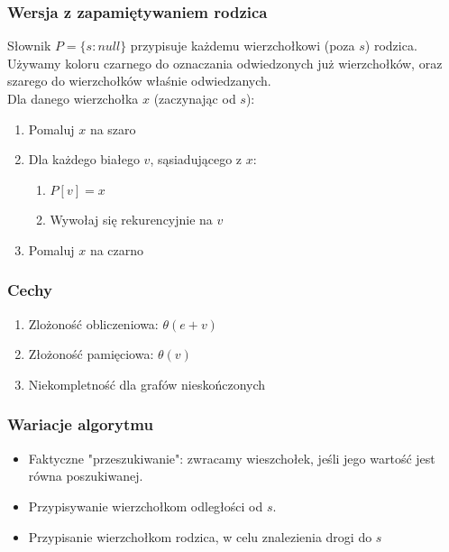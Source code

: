 \documentclass[12pt]{article}
\begin{document}
    \subsubsection{Wersja z zapamiętywaniem rodzica}

    Słownik $P = \{s : null\}$ przypisuje każdemu wierzchołkowi (poza $s$) rodzica. Używamy
    koloru czarnego do oznaczania odwiedzonych już wierzchołków, oraz szarego do
    wierzchołków właśnie odwiedzanych.\[\]
    Dla danego wierzchołka $x$ (zaczynając od $s$):
    \begin{enumerate}
        \item Pomaluj $x$ na szaro
        \item Dla każdego białego $v$, sąsiadującego z $x$:
        \begin{enumerate}
            \item $P[v] = x$
            \item Wywołaj się rekurencyjnie na $v$
        \end{enumerate}
        \item Pomaluj $x$ na czarno
    \end{enumerate}

    \subsubsection{Cechy}

    \begin{enumerate}
        \item Zlożoność obliczeniowa: $\theta(e + v)$
        \item Złożoność pamięciowa: $\theta(v)$
        \item Niekompletność dla grafów nieskończonych
    \end{enumerate}

    \subsubsection{Wariacje algorytmu}

    \begin{itemize}
        \item Faktyczne "przeszukiwanie": zwracamy wieszchołek, jeśli jego wartość jest
        równa poszukiwanej.
        \item Przypisywanie wierzchołkom odległości od $s$.
        \item Przypisanie wierzchołkom rodzica, w celu znalezienia drogi do $s$
    \end{itemize}
\end{document}
